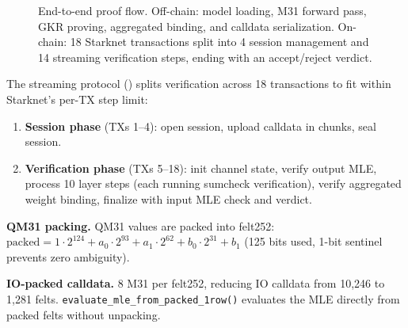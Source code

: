 \documentclass[10pt,twocolumn]{article}
\theoremstyle{definition}
\theoremstyle{remark}
\begin{document}
\begin{figure}[t]
  \caption{End-to-end proof flow. Off-chain: model loading, M31 forward
           pass, GKR proving, aggregated binding, and calldata serialization.
           On-chain: 18 Starknet transactions split into 4 session management
           and 14 streaming verification steps, ending with an accept/reject
           verdict.}
  \label{fig:streaming}
\end{figure}

The streaming protocol () splits verification
across 18 transactions to fit within Starknet's per-TX step limit:
\begin{enumerate}[nosep,leftmargin=1.4em]
  \item \textbf{Session phase} (TXs 1--4): open session, upload
        calldata in chunks, seal session.
  \item \textbf{Verification phase} (TXs 5--18): init channel state,
        verify output MLE, process 10 layer steps (each running
        sumcheck verification), verify aggregated weight binding,
        finalize with input MLE check and verdict.
\end{enumerate}

\textbf{QM31 packing.}
QM31 values are packed into felt252:
$\text{packed} = 1\cdot 2^{124} + a_0\cdot 2^{93} + a_1\cdot 2^{62}
+ b_0\cdot 2^{31} + b_1$
(125 bits used, 1-bit sentinel prevents zero ambiguity).

\textbf{IO-packed calldata.}
8 M31 per felt252, reducing IO calldata from 10{,}246 to 1{,}281 felts.
\texttt{evaluate\_mle\_from\_packed\_1row()} evaluates the MLE directly
from packed felts without unpacking.
\end{document}

